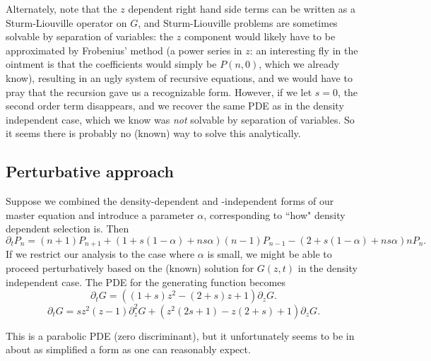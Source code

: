\documentclass[10pt]{revtex4}
\begin{document}
Alternately, note that the $z$ dependent right hand side terms can be written as a Sturm-Liouville operator on $G$, and Sturm-Liouville problems are sometimes solvable by separation of variables: the $z$ component would likely have to be approximated by Frobenius' method (a power series in $z$: an interesting fly in the ointment is that the coefficients would simply be $P(n,0)$, which we already know), resulting in an ugly system of recursive equations, and we would have to pray that the recursion gave us a recognizable form.
However, if we let $s = 0$, the second order term disappears, and we recover the same PDE as in the density independent case, which we know was \emph{not} solvable by separation of variables.
So it seems there is probably no (known) way to solve this analytically.

\subsection{Perturbative approach}

Suppose we combined the density-dependent and -independent forms of our master equation and introduce a parameter $\alpha$, corresponding to ``how" density dependent selection is.
Then 
\begin{equation}
\partial_t P_n = (n+1)P_{n+1} + (1+s(1-\alpha) + ns\alpha )(n-1)P_{n-1} - (2+s(1-\alpha)+ns\alpha) nP_n.
\end{equation}
If we restrict our analysis to the case where $\alpha$ is small, we might be able to proceed perturbatively based on the (known) solution for $G(z,t)$ in the density independent case.
The PDE for the generating function becomes
\begin{equation}
\partial_t G = ((1+s)z^2 - (2+s)z + 1)\partial_z G.
\end{equation}
\begin{equation}
\partial_t G = sz^2(z-1) \partial_z^2 G + (z^2(2s+1) - z(2+s) + 1)\partial_z G.
\end{equation}

This is a parabolic PDE (zero discriminant), but it unfortunately seems to be in about as simplified a form as one can reasonably expect.
\end{document}
